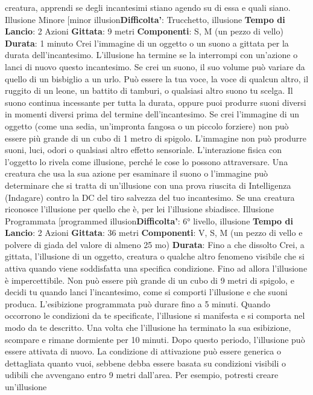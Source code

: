 \begin{multicols}{2}
creatura, apprendi se degli incantesimi stiano agendo
su di essa e quali siano.
Illusione Minore
[minor illusion\textbf{Difficolta'}:
Trucchetto, illusione
\textbf{Tempo di Lancio}: 2 Azioni
\textbf{Gittata}: 9 metri
\textbf{Componenti}: S, M (un pezzo di vello)
\textbf{Durata}: 1 minuto
Crei l’immagine di un oggetto o un suono a gittata per la
durata dell’incantesimo. L’illusione ha termine se la
interrompi con un’azione o lanci di nuovo questo
incantesimo.
Se crei un suono, il suo volume può variare da quello di
un bisbiglio a un urlo. Può essere la tua voce, la voce di
qualcun altro, il ruggito di un leone, un battito di
tamburi, o qualsiasi altro suono tu scelga. Il suono
continua incessante per tutta la durata, oppure puoi
produrre suoni diversi in momenti diversi prima del
termine dell’incantesimo.
Se crei l’immagine di un oggetto (come una sedia,
un’impronta fangosa o un piccolo forziere) non può
essere più grande di un cubo di 1 metro di spigolo.
L’immagine non può produrre suoni, luci, odori o
qualsiasi altro effetto sensoriale. L’interazione fisica con
l’oggetto lo rivela come illusione, perché le cose lo
possono attraversare.
Una creatura che usa la sua azione per esaminare il
suono o l’immagine può determinare che si tratta di
un’illusione con una prova riuscita di Intelligenza
(Indagare) contro la DC del tiro salvezza del tuo
incantesimo. Se una creatura riconosce l’illusione per
quello che è, per lei l’illusione sbiadisce.
Illusione Programmata
[programmed illusion\textbf{Difficolta'}:
6° livello, illusione
\textbf{Tempo di Lancio}: 2 Azioni
\textbf{Gittata}: 36 metri
\textbf{Componenti}: V, S, M (un pezzo di vello e polvere di
giada del valore di almeno 25 mo)
\textbf{Durata}: Fino a che dissolto
Crei, a gittata, l’illusione di un oggetto, creatura o
qualche altro fenomeno visibile che si attiva quando
viene soddisfatta una specifica condizione. Fino ad
allora l’illusione è impercettibile. Non può essere più
grande di un cubo di 9 metri di spigolo, e decidi tu
quando lanci l’incantesimo, come si comporti l’illusione
e che suoni produca. L’esibizione programmata può
durare fino a 5 minuti.
Quando occorrono le condizioni da te specificate,
l’illusione si manifesta e si comporta nel modo da te
descritto. Una volta che l’illusione ha terminato la sua
esibizione, scompare e rimane dormiente per 10 minuti.
Dopo questo periodo, l’illusione può essere attivata di
nuovo.
La condizione di attivazione può essere generica o
dettagliata quanto vuoi, sebbene debba essere basata
su condizioni visibili o udibili che avvengano entro 9
metri dall’area. Per esempio, potresti creare un’illusione

\end{multicols}
